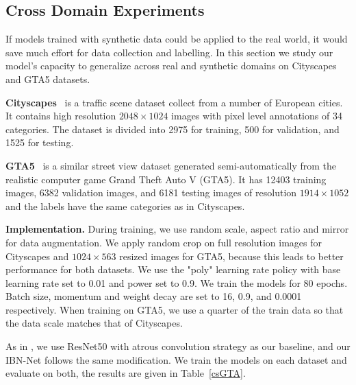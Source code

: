 \documentclass[runningheads]{llncs}
\begin{document}
\subsection{Cross Domain Experiments}

If models trained with synthetic data could be applied to the real world, it would save much effort for data collection and labelling.
In this section we study our model's capacity to generalize across real and synthetic domains on Cityscapes and GTA5 datasets.

\textbf{Cityscapes}~\cite{cordts2016cityscapes} is a traffic scene dataset collect from a number of European cities.
It contains high resolution \(2048 \times 1024\) images with pixel level annotations of 34 categories.
The dataset is divided into 2975 for training, 500 for validation, and 1525 for testing.

\textbf{GTA5}~\cite{Richter_2016_ECCV} is a similar street view dataset generated semi-automatically from the realistic computer game Grand Theft Auto V (GTA5).
It has 12403 training images, 6382 validation images, and 6181 testing images of resolution \(1914 \times 1052\) and the labels have the same categories as in Cityscapes.



\textbf{Implementation.} 
During training, we use random scale, aspect ratio and mirror for data augmentation.
We apply random crop on full resolution images for Cityscapes and \(1024 \times 563\) resized images for GTA5, because this leads to better performance for both datasets.
We use the "poly" learning rate policy with base learning rate set to 0.01 and power set to 0.9.
We train the models for 80 epochs.
Batch size, momentum and weight decay are set to 16, 0.9, and 0.0001 respectively.
When training on GTA5, we use a quarter of the train data so that the data scale matches that of Cityscapes.

As in \cite{chen2017deeplab}, we use ResNet50 with atrous convolution strategy as our baseline, and our IBN-Net follows the same modification.
We train the models on each dataset and evaluate on both, the results are given in Table~\ref{csGTA}.
\end{document}
